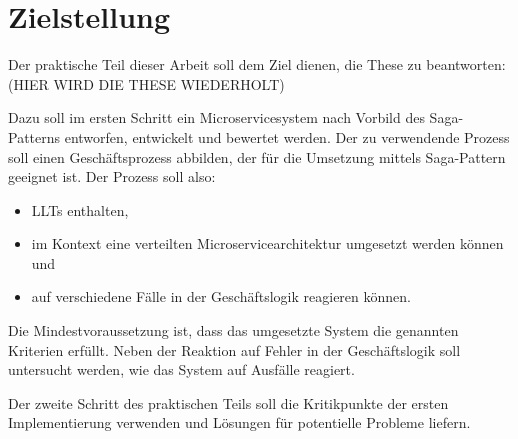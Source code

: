 \section{Zielstellung}

Der praktische Teil dieser Arbeit soll dem Ziel dienen, die These zu beantworten:
(HIER WIRD DIE THESE WIEDERHOLT)

Dazu soll im ersten Schritt ein Microservicesystem  nach Vorbild des Saga-Patterns entworfen, entwickelt und bewertet werden. Der zu verwendende Prozess soll einen Geschäftsprozess abbilden, der für die Umsetzung mittels Saga-Pattern geeignet ist. Der Prozess soll also:
\begin{itemize}
	\item LLTs enthalten,
	\item im Kontext eine verteilten Microservicearchitektur umgesetzt werden können und
	\item auf verschiedene Fälle in der Geschäftslogik reagieren können.
\end{itemize}

Die Mindestvoraussetzung ist, dass das umgesetzte System die genannten Kriterien erfüllt. Neben der Reaktion auf Fehler in der Geschäftslogik soll untersucht werden, wie das System auf Ausfälle reagiert. 

Der zweite Schritt des praktischen Teils soll die Kritikpunkte der ersten Implementierung verwenden und Lösungen für potentielle Probleme liefern. 